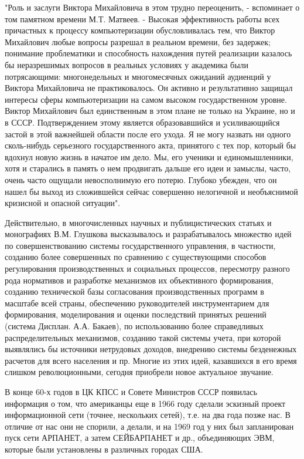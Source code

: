 "Роль и заслуги Виктора Михайловича в этом трудно переоценить, - вспоминает о
том памятном времени М.Т. Матвеев. - Высокая эффективность работы всех
причастных к процессу компьютеризации обусловливалась тем, что Виктор Михайлович
любые вопросы разрешал в реальном времени, без задержек; понимание проблематики
и способность нахождения путей реализации казалось бы неразрешимых вопросов в
реальных условиях у академика были потрясающими: многонедельных и многомесячных
ожиданий аудиенций у Виктора Михайловича не практиковалось. Он активно и
результативно защищал интересы сферы компьютеризации на самом высоком
государственном уровне. Виктор Михайлович был единственным в этом плане не
только на Украине, но и в СССР. Подтверждением этому является образовавшийся и
усиливающийся застой в этой важнейшей области после его ухода. Я не могу назвать
ни одного сколь-нибудь серьезного государственного акта, принятого с тех пор,
который бы вдохнул новую жизнь в начатое им дело. Мы, его ученики и
единомышленники, хотя и старались в память о нем продвигать дальше его идеи и
замыслы, часто, очень часто ощущали невосполнимую его потерю. Глубоко убежден,
что он нашел бы выход из сложившейся сейчас совершенно нелогичной и необъяснимой
кризисной и опасной ситуации".

Действительно, в многочисленных научных и публицистических статьях и монографиях
В.М. Глушкова высказывалось и разрабатывалось множество идей по
совершенствованию системы государственного управления, в частности, созданию
более совершенных по сравнению с существующими способов регулирования
производственных и социальных процессов, пересмотру разного рода нормативов и
разработке механизмов их объективного формирования, созданию технической базы
согласования производственных программ в масштабе всей страны, обеспечению
руководителей инструментарием для формирования, моделирования и оценки
последствий принятых решений (система Дисплан. А.А. Бакаев), по использованию
более справедливых распределительных механизмов, созданию такой системы учета,
при которой выявлялись бы источники нетрудовых доходов, внедрению системы
безденежных расчетов для всего населения и пр. Многие из этих идей, казавшихся в
его время слишком революционными, сегодня приобрели новое актуальное звучание.

В конце 60-х годов в ЦК КПСС и Совете Министров СССР появилась информация о том,
что американцы еще в 1966 году сделали эскизный проект информационной сети
(точнее, нескольких сетей), т.е. на два года позже нас. В отличие от нас они не
спорили, а делали, и на 1969 год у них был запланирован пуск сети АРПАНЕТ, а
затем СЕЙБАРПАНЕТ и др., объединяющих ЭВМ, которые были установлены в различных
городах США.


